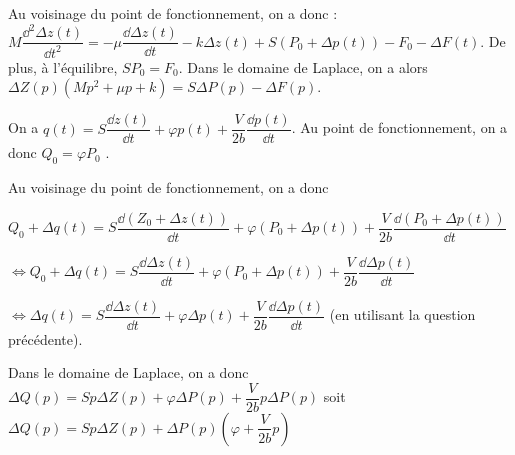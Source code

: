 \ifprof
\begin{corrige}
Au voisinage du point de fonctionnement, on a donc : $M\dfrac{\dd^2 \Delta z(t)}{\dd t^2} = -\mu \dfrac{\dd \Delta z (t)}{\dd t} - k\Delta z(t) +S\left( P_0 +\Delta p(t ) \right)-F_0 - \Delta F(t )$. De plus, à l'équilibre, $SP_0=F_0$. 
Dans le domaine de Laplace, on a alors $ \Delta Z(p)  \left( Mp^2 + \mu p +k\right) = S\Delta P(p) - \Delta F(p )$.
\end{corrige}
\else
\fi


\ifprof
\begin{corrige}
On a $q(t)=S \dfrac{\dd z (t)}{\dd t} +\varphi p(t) + \dfrac{V}{2b}  \dfrac{\dd p(t)}{\dd t} $.
Au point de fonctionnement, on a donc $Q_0 = \varphi P_0$ .
\end{corrige}
\else
\fi




\ifprof
\begin{corrige}
Au voisinage du point de fonctionnement, on a donc  


$ Q_0 +\Delta q(t )=S \dfrac{\dd \left(Z_0 +\Delta z (t )\right)}{\dd t} +\varphi \left( P_0 +\Delta p(t ) \right) + \dfrac{V}{2b}  \dfrac{\dd \left(P_0 +\Delta p(t )\right)}{\dd t}$

$ \Leftrightarrow Q_0 +\Delta q(t )=S \dfrac{\dd \Delta z (t )}{\dd t} +\varphi \left( P_0 +\Delta p(t ) \right) + \dfrac{V}{2b}  \dfrac{\dd \Delta p(t )}{\dd t}$

$ \Leftrightarrow \Delta q(t )=S \dfrac{\dd \Delta z (t )}{\dd t} +\varphi  \Delta p(t ) + \dfrac{V}{2b}  \dfrac{\dd \Delta p(t )}{\dd t}$ (en utilisant la question précédente).

Dans le domaine de Laplace, on a donc $  \Delta Q(p)=S p\Delta Z(p ) +\varphi  \Delta P(p) + \dfrac{V}{2b}  p \Delta P(p)$ soit 
$  \Delta Q(p)=S p\Delta Z(p ) + \Delta P(p)\left(\varphi  + \dfrac{V}{2b}  p\right)$


\end{corrige}
\else
\fi

